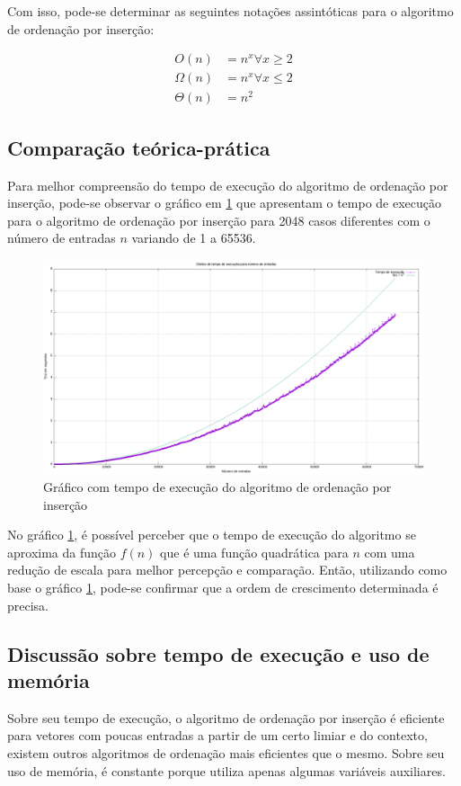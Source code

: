 Com isso, pode-se determinar as seguintes notações assintóticas para o algoritmo de ordenação 
por inserção:

\begin{align*} \label{cap:2:eq:insertionSort:3}
    O(n) &= n^x \forall x \geq 2 \\ 
    \Omega(n) &= n^x \forall x \leq 2 \\
    \Theta(n) &= n^2
\end{align*}

\subsection{Comparação teórica-prática}

Para melhor compreensão do tempo de execução do algoritmo de ordenação por inserção, pode-se observar o gráfico
em \ref{cap:2:graph:insertionSort} que apresentam o tempo de execução para o algoritmo de ordenação por inserção
para 2048 casos diferentes com o número de entradas $n$ variando de 1 a 65536.

\begin{figure}[h]
    \centering
    \includegraphics[width=\textwidth]{image/graphics/insertionSort.png}
    \caption{Gráfico com tempo de execução do algoritmo de ordenação por inserção}
    \label{cap:2:graph:insertionSort}
\end{figure}

No gráfico \ref{cap:2:graph:insertionSort}, é possível perceber que o tempo de execução do algoritmo se aproxima
da função $f(n)$ que é uma função quadrática para $n$ com uma redução de escala para melhor percepção e comparação. Então,
utilizando como base o gráfico \ref{cap:2:graph:insertionSort}, pode-se confirmar que a ordem de crescimento determinada é
precisa.

\subsection{Discussão sobre tempo de execução e uso de memória}

Sobre seu tempo de execução, o algoritmo de ordenação por inserção é eficiente para vetores
com poucas entradas a partir de um certo limiar e do contexto, existem outros algoritmos de ordenação
mais eficientes que o mesmo. Sobre seu uso de memória, é constante porque utiliza apenas algumas variáveis
auxiliares.

